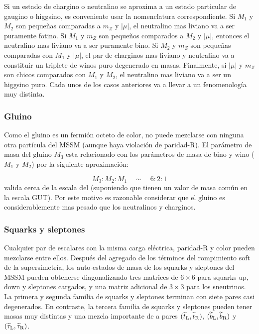 Si un estado de chargino o neutralino se aproxima a un estado particular de
gaugino o higgsino, es conveniente usar la nomenclatura correspondiente. Si
$M_1$ y $M_2$ son pequeñas comparadas a $m_Z$ y $|\mu|$, el neutralino mas
liviano va a ser puramente fotino. Si $M_1$ y $m_Z$ son pequeños comparados a
$M_2$ y $|\mu|$, entonces el neutralino mas liviano va a ser puramente bino. Si
$M_2$ y $m_Z$ son pequeñas comparadas con $M_1$ y $|\mu|$, el par de charginos
mas liviano y neutralino va a constituir un triplete de winos puro degenerado en
masas. Finalmente, si $|\mu|$ y $m_Z$ son chicos comparados con $M_1$ y $M_2$,
el neutralino mas liviano va a ser un higgsino puro. Cada unos de los casos
anteriores va a llevar a un fenomenología muy distinta.


\subsubsection{Gluino}

Como el gluino es un fermión octeto de color, no puede mezclarse con ninguna
otra partícula del MSSM (aunque haya violación de paridad-R). El parámetro de
masa del gluino $M_3$ esta relacionado con los parámetros de masa de bino y wino
($M_1$ y $M_2$) por la siguiente aproximación:

\begin{equation}
  M_3 : M_2 : M_1 \quad \sim \quad 6 : 2 : 1
\end{equation}
%
valida cerca de la escala del \tev (suponiendo que tienen un valor de masa común
en la escala GUT). Por este motivo es razonable considerar que el gluino es
considerablemente mas pesado que los neutralinos y charginos.


\subsubsection{Squarks y sleptones}

Cualquier par de escalares con la misma carga eléctrica, paridad-R y color
pueden mezclarse entre ellos. Después del agregado de los términos del
rompimiento soft de la supersimetría, los auto-estados de masa de los squarks y
sleptones del MSSM pueden obtenerse diagonalizando tres matrices de $6\times6$
para squarks up, down y sleptones cargados, y una matriz adicional de $3\times
3$ para los sneutrinos. La primera y segunda familia de squarks y sleptones
terminan con siete pares casi degenerados. En contraste, la tercera familia de
squarks y sleptones pueden tener masas muy distintas y una mezcla importante de
a pares $(\widetilde{t}_{\mathrm{L}}, \widetilde{t}_{\mathrm{R}})$, $(\widetilde{b}_{\mathrm{L}}, \widetilde{b}_{\mathrm{R}})$ y $(\widetilde{\tau}_{\mathrm{L}}, \widetilde{\tau}_{\mathrm{R}})$.

